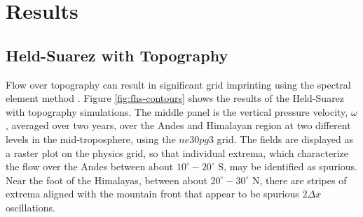 \documentclass{agujournal}
\begin{document}
\section{Results}\label{sec:results}

\subsection{Held-Suarez with Topography}\label{sec:hs94}

Flow over topography can result in significant grid imprinting using the spectral element method \citep[][H18]{gmdd-8-4623-2015}. Figure \ref{fig:fhs-contours} shows the results of the Held-Suarez with topography simulations. The middle panel is the vertical pressure velocity, $\omega$, averaged over two years, over the Andes and Himalayan region at two different levels in the mid-troposphere, using the $ne30pg3$ grid. The fields are displayed as a raster plot on the physics grid, so that individual extrema, which characterize the flow over the Andes between about $10^\circ-20^\circ$ S, may be identified as spurious. Near the foot of the Himalayas, between about $20^\circ-30^\circ$ N, there are stripes of extrema aligned with the mountain front that appear to be spurious $2\Delta x$ oscillations.
\end{document}
